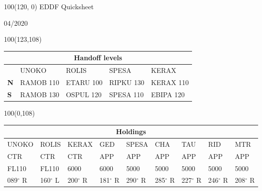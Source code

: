 \documentclass[10pt,landscape,a4paper]{article}
\begin{document}
\begin{textblock}{100}(120, 0)
  \large
  \centering
  EDDF Quicksheet

  04/2020
\end{textblock}

\begin{textblock}{100}(123,108)
\footnotesize
\begin{table}[]
\begin{tabular}{|l|l|l|l|l|}
\multicolumn{5}{c}{\textbf{Handoff levels}}              \\ \hline
           & UNOKO     & ROLIS     & SPESA     & KERAX     \\ \hline
\textbf{N} & RAMOB 110 & ETARU 100 & RIPKU 130 & KERAX 110 \\
\textbf{S} & RAMOB 130 & OSPUL 120 & SPESA 110 & EBIPA 120 \\ \hline
\end{tabular}
\end{table}
\end{textblock}

\begin{textblock}{100}(0,108)
\footnotesize
\begin{table}[]
\begin{tabular}{|l|l|l|l|l|l|l|l|l|}

\multicolumn{9}{c}{\textbf{Holdings}}                                        \\ \hline
UNOKO  & ROLIS  & KERAX  & GED    & SPESA  & CHA    & TAU    & RID    & MTR    \\ \hline
CTR    & CTR    & CTR    & APP    & APP    & APP    & APP    & APP    & APP    \\
FL110  & FL110  & 6000   & 6000   & 5000   & 5000   & 5000   & 5000   & 5000   \\
089$^\circ$ R & 160$^\circ$ L & 200$^\circ$ R & 181$^\circ$ R & 290$^\circ$ R & 285$^\circ$ R & 227$^\circ$ R & 246$^\circ$ R & 208$^\circ$ R \\ \hline
\end{tabular}
\end{table}
\end{textblock}
\end{document}
